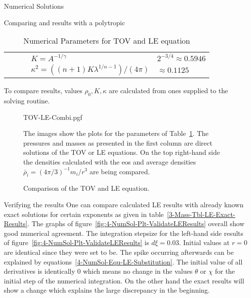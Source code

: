 \begin{section}{Numerical Solutions}
\begin{subsection}{Comparing \texorpdfstring{}{TOV} and \texorpdfstring{}{LE} results with a polytropic \texorpdfstring{}{EoS}}
\begin{table}[H]
{\begin{tabular}{@{}llcll@{}}
		&&& $K=A^{-1/\gamma}$ & $2^{-3/4}\approx0.5946$\\
		&&& $\kappa^2=((n+1)K\lambda^{1/n-1})/(4\pi)$ & $\approx0.1125$\\
		\bottomrule
	\end{tabular}
	}
	\caption[Numerical Parameters for  and LE equation]{Numerical Parameters for \ac{TOV} and \ac{LE} equation}
	\label{tab:4-NumSol-Tbl-TOVParameters}
	\small
	To compare results, values $\rho_0,K,\kappa$ are calculated from ones supplied to the solving routine.
\end{table}%
\begin{figure}[H]
	{\centering
	{TOV-LE-Combi.pgf}
	}
	\caption[Comparison of the  and  equation]{Comparison of the \ac{TOV} and \ac{LE} equation.}
	\label{fig:4-NumSol-Plt-TOVEqEasyEOS}
	\small
	The images show the plots for the parameters of Table~\ref{tab:4-NumSol-Tbl-TOVParameters}.
	The pressures and masses as presented in the first column are direct solutions of the \ac{TOV} or \ac{LE} equations.
	On the top right-hand side the densities calculated with the \ac{eos} and average densities $\bar{\rho}_i=(4\pi/3)^{-1}m_i/r^3$ are being compared.
\end{figure}
\end{subsection}
%
%
\begin{subsection}{Verifying the results}
\label{4-NumSol-Sec-Verifiying-the-results}
One can compare calculated \ac{LE} results with already known exact  solutions for certain exponents as given in table~\ref{3-Mass-Tbl-LE-Exact-Results}.
The graphs of figure~\ref{fig:4-NumSol-Plt-ValidateLEResults} overall show good numerical agreement.
The integration stepsize for the left-hand side results of figure~\ref{fig:4-NumSol-Plt-ValidateLEResults} is $d\xi=0.03$.
Initial values at $r=0$ are identical since they were set to be.
The spike occurring afterwards can be explained by equations~\eqref{4-NumSol-Equ-LE-Substitution}.
The initial value of all derivatives is identically $0$ which means no change in the values $\theta$ or $\chi$ for the initial step of the numerical integration.
On the other hand the exact results will show a change which explains the large discrepancy in the beginning.

\end{subsection}
\end{section}

